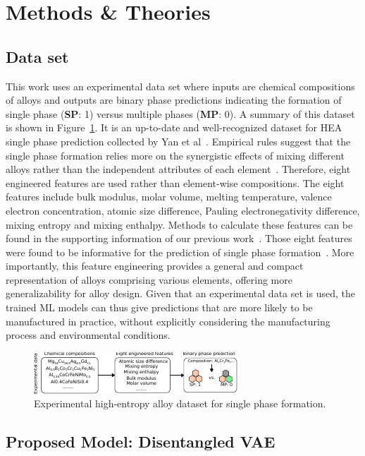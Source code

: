 \documentclass[a4paper]{article}
\begin{document}
\section{Methods \& Theories}
\subsection{Data set}
This work uses an experimental data set where inputs are chemical compositions of alloys and outputs are binary phase predictions indicating the formation of single phase (\textbf{SP}: 1) versus multiple phases (\textbf{MP}: 0).
A summary of this dataset is shown in Figure~\ref{fig:dataset}.
It is an up-to-date and well-recognized dataset for HEA single phase prediction collected by Yan et al~\cite{yan2021}.
Empirical rules suggest that the single phase formation relies more on the synergistic effects of mixing different alloys rather than the independent attributes of each element~\cite{yan2021, pei2020}.
Therefore, eight engineered features are used rather than element-wise compositions.
The eight features include bulk modulus, molar volume, melting temperature, valence electron concentration, atomic size difference, Pauling electronegativity difference, mixing entropy and mixing enthalpy.
Methods to calculate these features can be found in the supporting information of our previous work~\cite{zeng2024}.
Those eight features were found to be informative for the prediction of single phase formation~\cite{zeng2024, yan2021}.
More importantly, this feature engineering provides a general and compact representation of alloys comprising various elements, offering more generalizability for alloy design.
Given that an experimental data set is used, the trained ML models can thus give predictions that are more likely to be manufactured in practice, without explicitly considering the manufacturing process and environmental conditions.

\begin{figure}
\centering
\includegraphics[width=5.in]{figures/dataset.pdf}
\caption{Experimental high-entropy alloy dataset for single phase formation.
\label{fig:dataset}}
\end{figure}

\subsection{Proposed Model: Disentangled VAE}
\end{document}
